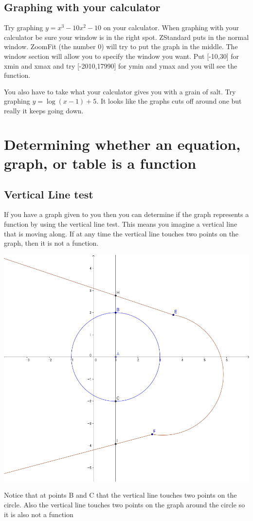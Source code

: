 \documentclass{tufte-handout}
\begin{document}
\subsection{Graphing with your calculator}

Try graphing $y = x^3 -10x^2-10$ on your calculator.  When graphing with your calculator be sure your window is in the right spot.  ZStandard puts in the normal window.  ZoomFit (the number 0) will try to put the graph in the middle.  The window section will allow you to specify the window you want.  Put [-10,30] for xmin and xmax and try [-2010,17990] for ymin and ymax and you will see the function.

You also have to take what your calculator gives you with a grain of salt.  Try graphing $y = \log(x-1) + 5$.  It looks like the graphs cuts off around one but really it keeps going down.

\section{Determining whether an equation, graph, or table is a function}
\subsection{Vertical Line test}
If you have a graph given to you then you can determine if the graph represents a function by using the vertical line test.  This means you imagine a vertical line that is moving along.  If at any time the vertical line touches two points on the graph, then it is not a function.

\begin{marginfigure}
	\includegraphics[width=\linewidth]{2-2VertLineTest.png}
    \caption{Notice that at points B and C that the vertical line touches two points on the circle.  Also the vertical line touches two points on the graph around the circle so it is also not a function}
\end{marginfigure}
\end{document}
